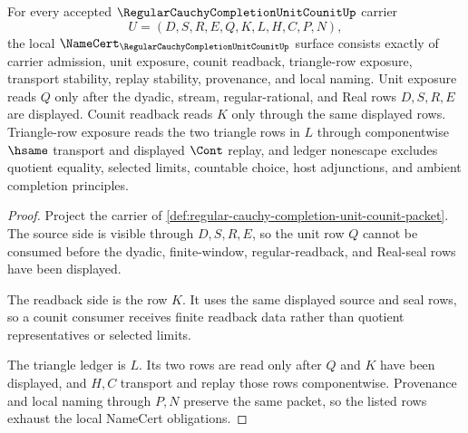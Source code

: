 \begin{theorem}
\label{thm:regular-cauchy-completion-unit-counit-obligations}
For every accepted $\RegularCauchyCompletionUnitCounitUp$ carrier
$$
U=(D,S,R,E,Q,K,L,H,C,P,N),
$$
the local $\NameCert_{\RegularCauchyCompletionUnitCounitUp}$ surface consists exactly of carrier admission, unit exposure, counit readback, triangle-row exposure, transport stability, replay stability, provenance, and local naming. Unit exposure reads $Q$ only after the dyadic, stream, regular-rational, and Real rows $D,S,R,E$ are displayed. Counit readback reads $K$ only through the same displayed rows. Triangle-row exposure reads the two triangle rows in $L$ through componentwise $\hsame$ transport and displayed $\Cont$ replay, and ledger nonescape excludes quotient equality, selected limits, countable choice, host adjunctions, and ambient completion principles.
\end{theorem}
\begin{proof}
Project the carrier of \autoref{def:regular-cauchy-completion-unit-counit-packet}. The source side is visible through $D,S,R,E$, so the unit row $Q$ cannot be consumed before the dyadic, finite-window, regular-readback, and Real-seal rows have been displayed.

The readback side is the row $K$. It uses the same displayed source and seal rows, so a counit consumer receives finite readback data rather than quotient representatives or selected limits.

The triangle ledger is $L$. Its two rows are read only after $Q$ and $K$ have been displayed, and $H,C$ transport and replay those rows componentwise. Provenance and local naming through $P,N$ preserve the same packet, so the listed rows exhaust the local NameCert obligations.
\end{proof}

